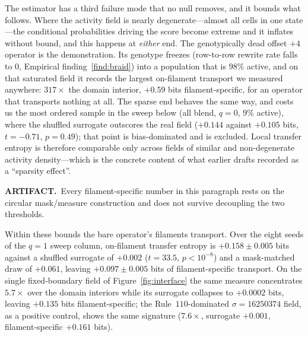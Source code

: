 \documentclass[man,12pt,floatsintext,donotrepeattitle]{apa7}
\newcommand{\flagged}[3]{%
  \par\vspace{3pt}\noindent
  \colorbox{#1}{\parbox{\dimexpr\linewidth-2\fboxsep\relax}{%
    \footnotesize\textbf{#2}\ #3}}%
  \par\vspace{3pt}}
\begin{document}
The estimator has a third failure mode that no null removes, and it bounds
what follows. Where the activity field is nearly degenerate---almost all cells
in one state---the conditional probabilities driving the score become extreme
and it inflates without bound, and this happens at \emph{either} end. The
genotypically dead offset $+4$ operator is the demonstration. Its genotype
freezes (row-to-row rewrite rate falls to $0$, Empirical
finding~\ref{find:braid}) into a
population that is $98\%$ active, and on that saturated field it records the
largest on-filament transport we measured anywhere: $317\times$ the domain
interior, $+0.59$ bits filament-specific, for an operator that transports
nothing at all. The sparse end behaves the same way, and costs us the most
ordered sample in the sweep below (all blend, $q=0$, $9\%$ active), where the
shuffled surrogate outscores the real field ($+0.144$ against $+0.105$ bits,
$t = -0.71$, $p = 0.49$); that point is bias-dominated and is excluded. Local
transfer entropy is therefore comparable only across fields of similar and
non-degenerate activity density---which is the concrete content of what earlier
drafts recorded as a ``sparsity effect''.

\flagged{markArtifact}{ARTIFACT.}{Every filament-specific number in this
paragraph rests on the circular mask/measure construction and does not survive
decoupling the two thresholds.}
Within these bounds the bare operator's filaments transport. Over the eight
seeds of the $q=1$ sweep column, on-filament transfer entropy is
$+0.158 \pm 0.005$ bits against a shuffled surrogate of $+0.002$
($t = 33.5$, $p < 10^{-8}$) and a mask-matched draw of $+0.061$, leaving
$+0.097 \pm 0.005$ bits of filament-specific transport. On the single
fixed-boundary field of Figure~\ref{fig:interface} the same measure concentrates
$5.7\times$ over the domain interiors while its surrogate collapses to
$+0.0002$ bits, leaving $+0.135$ bits filament-specific; the
Rule~$110$-dominated $\sigma = 16250374$ field, as a positive control, shows the
same signature ($7.6\times$, surrogate $+0.001$, filament-specific $+0.161$
bits).
\end{document}
